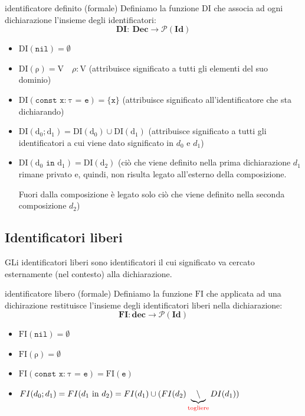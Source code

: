 \begin{mydef}{identificatore definito (formale)}
    Definiamo la funzione $\mathrm{DI}$ che associa ad ogni dichiarazione l'insieme degli identificatori:
    \[
        \mathbf{DI:} \ \mathbf{Dec} \rightarrow \mathcal{P}\mathbf{(Id)}
    \]

    \begin{itemize}[label=$\triangleright$, itemsep=\smallskipamount]
        \item $\mathrm{DI(\texttt{nil})} = \emptyset$
        \item $\mathrm{DI(\rho)} = \mathrm{V} \quad \rho : \mathrm{V}$ (attribuisce significato a tutti gli elementi del suo dominio)
        \item $\mathrm{DI(\texttt{const \ x:} \ \tau \texttt{ = e}) = \{\texttt{x}\}}$ (attribuisce significato all'identificatore che sta dichiarando)
        \item $\mathrm{DI(d_0 ; d_1) = DI(d_0) \cup DI(d_1)}$ (attribuisce significato a tutti gli identificatori a cui viene dato significato in $d_0$ e $d_1$)
        \item $\mathrm{DI(d_0 \texttt{ in } d_1) = DI(d_2)}$ (ciò che viene definito nella prima dichiarazione $d_1$ rimane privato e, quindi, non risulta legato all'esterno della composizione. 
        
        Fuori dalla composizione è legato solo ciò che viene definito nella seconda composizione $d_2$)
    \end{itemize}
\end{mydef}

\subsection{Identificatori liberi}
GLi identificatori liberi sono identificatori il cui significato va cercato esternamente (nel contesto) alla dichiarazione.

\begin{mydef}{identificatore libero (formale)}
    Definiamo la funzione $\mathrm{FI}$ che applicata ad una dichirazione restituisce l'insieme degli identificatori liberi nella dichiarazione:
    \[
        \mathbf{FI : dec} \rightarrow \mathcal{P}\mathbf{(Id)}
    \]

    \begin{itemize}[label=$\triangleright$, itemsep=\smallskipamount]
        \item $\mathrm{FI(\texttt{nil})} = \emptyset$
        \item $\mathrm{FI(\rho)} = \emptyset$
        \item $\mathrm{FI(\texttt{const \ x:} \ \tau \texttt{ = e}) = FI(\texttt{e})}$
        \item $FI(d_0 ; d_1) = FI(d_1 \text{ in } d_2) = FI(d_1) \cup (FI(d_2) \underbrace{\setminus}_{\textcolor{red}{\text{togliere}}} DI(d_1))$
    \end{itemize}
\end{mydef}

